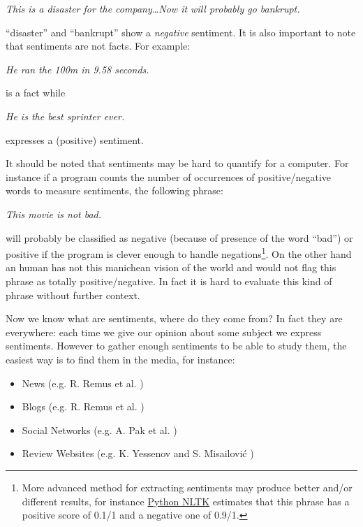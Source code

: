 \documentclass[12pt]{report}
\begin{document}
\begin{center}
	\emph{This is a {\color{red}disaster} for the company\ldots Now it will probably go {\color{red}bankrupt}.}
\end{center}

``{\color{red}disaster}'' and ``{\color{red}bankrupt}'' show a \emph{negative} sentiment. It is also important to note that sentiments are not facts. For example:

\begin{center}
	\emph{He ran the 100m in 9.58 seconds.}
\end{center} is a fact while

\begin{center}
	\emph{He is the best sprinter ever.}
\end{center}

expresses a (positive) sentiment.

It should be noted that sentiments may be hard to quantify for a computer. For instance if a program counts the number of occurrences of positive/negative words to measure sentiments, the following phrase:

\begin{center}
	\emph{This movie is not bad.}
\end{center}

will probably be classified as negative (because of presence of the word ``bad'') or positive if the program is clever enough to handle negations\footnote{More advanced method for extracting sentiments may produce better and/or different results, for instance \href{http://text-processing.com/demo/sentiment/}{Python NLTK} estimates that this phrase has a positive score of 0.1/1 and a negative one of 0.9/1.}. On the other hand an human has not this manichean vision of the world and would not flag this phrase as totally positive/negative. In fact it is hard to evaluate this kind of phrase without further context.

Now we know what are sentiments, where do they come from? In fact they are everywhere: each time we give our opinion about some subject we express sentiments. However to gather enough sentiments to be able to study them, the easiest way is to find them in the media, for instance:
\begin{itemize}
	\item News (e.g. R. Remus et al. \cite{remus09})
	\item Blogs (e.g. R. Remus et al. \cite{remus09})
	\item Social Networks (e.g. A. Pak et al. \cite{pak10})
	\item Review Websites (e.g. K. Yessenov and S. Misailovi\'c \cite{yessenov09})
\end{itemize}
\end{document}
